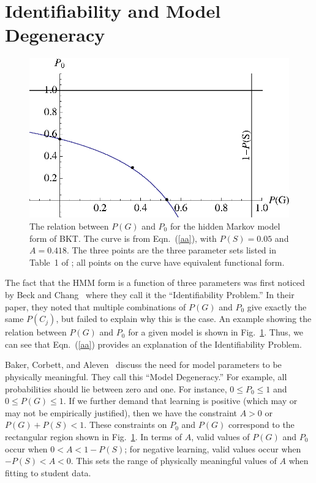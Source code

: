 \documentclass{acmlarge-edm}
\begin{document}
\section{Identifiability and Model Degeneracy}

\begin{figure}
\centering\includegraphics{table1.eps}
\caption{The relation between $P(G)$ and $P_0$ for the hidden
  Markov model form of BKT.  
  The curve is from Eqn.~(\ref{aa}), with $P(S)=0.05$ and $A=0.418$.
  The three points are the three parameter sets listed in Table~1 of
  \cite{beck_identifiability:_2007}; all points on the curve have
  equivalent functional form.
 }
 \label{table1}
\end{figure}

The fact that the HMM form is a function of three parameters
was first noticed by Beck and Chang~\citeyear{beck_identifiability:_2007} 
where they call it the ``Identifiability Problem.''   In their paper, 
they noted that multiple
combinations of $P(G)$ and $P_0$ give exactly the same $P(C_j)$, but
failed to explain why this is the case.  An example showing the relation
between $P(G)$ and $P_0$ for a given model is shown in Fig.~\ref{table1}.
Thus, we can see that Eqn.~(\ref{aa}) provides an explanation of the
Identifiability Problem.

Baker, Corbett, and Aleven~\citeyear{baker_more_2008} discuss the need for 
model parameters to be physically meaningful.  They call this 
``Model Degeneracy.''   For example, all probabilities should lie between 
zero and one.  For instance, $0\le P_0\le 1$ and $0\le P(G) \le 1$.
If we further demand that learning is positive (which may or may not be
empirically justified), then we have the constraint $A>0$ or $P(G)+P(S)<1$.
These constraints on $P_0$ and $P(G)$ correspond to the rectangular region shown in Fig.~\ref{table1}.
In terms of $A$, valid values of $P(G)$ and $P_0$ occur when
$0<A<1-P(S)$; for negative learning, valid values occur when
$-P(S)<A<0$.  This sets the range of physically meaningful values of
$A$ when fitting to student data.
\end{document}
